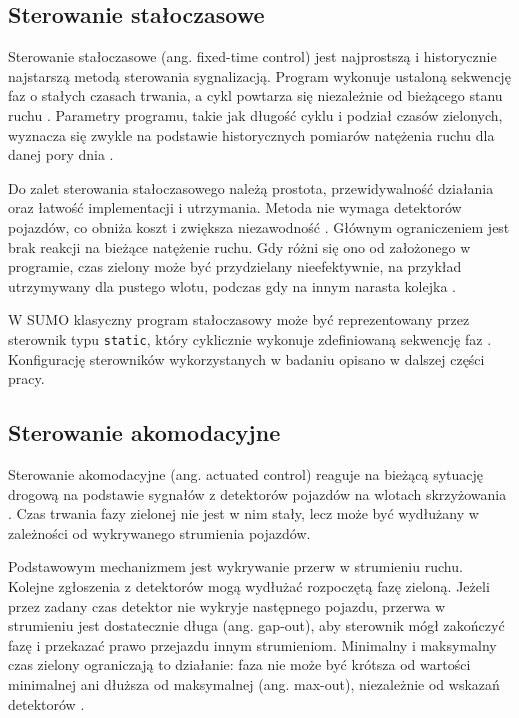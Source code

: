 \subsection{Sterowanie stałoczasowe}
\label{subsec:staloczasowe}

Sterowanie stałoczasowe (ang. fixed-time control) jest najprostszą i historycznie najstarszą metodą sterowania sygnalizacją. Program wykonuje ustaloną sekwencję faz o stałych czasach trwania, a cykl powtarza się niezależnie od bieżącego stanu ruchu \cite{NAP22097, koonce2008traffic}. Parametry programu, takie jak długość cyklu i podział czasów zielonych, wyznacza się zwykle na podstawie historycznych pomiarów natężenia ruchu dla danej pory dnia \cite{koonce2008traffic}.

Do zalet sterowania stałoczasowego należą prostota, przewidywalność działania oraz łatwość implementacji i utrzymania. Metoda nie wymaga detektorów pojazdów, co obniża koszt i zwiększa niezawodność \cite{wei2019survey}. Głównym ograniczeniem jest brak reakcji na bieżące natężenie ruchu. Gdy różni się ono od założonego w programie, czas zielony może być przydzielany nieefektywnie, na przykład utrzymywany dla pustego wlotu, podczas gdy na innym narasta kolejka \cite{wei2019survey, NAP22097}.

W SUMO klasyczny program stałoczasowy może być reprezentowany przez sterownik typu \texttt{static}, który cyklicznie wykonuje zdefiniowaną sekwencję faz \cite{sumoTrafficLights}. Konfigurację sterowników wykorzystanych w badaniu opisano w dalszej części pracy.

\subsection{Sterowanie akomodacyjne}
\label{subsec:akomodacyjne}

Sterowanie akomodacyjne (ang. actuated control) reaguje na bieżącą sytuację drogową na podstawie sygnałów z detektorów pojazdów na wlotach skrzyżowania \cite{NAP22097, koonce2008traffic}. Czas trwania fazy zielonej nie jest w nim stały, lecz może być wydłużany w zależności od wykrywanego strumienia pojazdów.

Podstawowym mechanizmem jest wykrywanie przerw w strumieniu ruchu. Kolejne zgłoszenia z detektorów mogą wydłużać rozpoczętą fazę zieloną. Jeżeli przez zadany czas detektor nie wykryje następnego pojazdu, przerwa w strumieniu jest dostatecznie długa (ang. gap-out), aby sterownik mógł zakończyć fazę i przekazać prawo przejazdu innym strumieniom. Minimalny i maksymalny czas zielony ograniczają to działanie: faza nie może być krótsza od wartości minimalnej ani dłuższa od maksymalnej (ang. max-out), niezależnie od wskazań detektorów \cite{NAP22097}.

